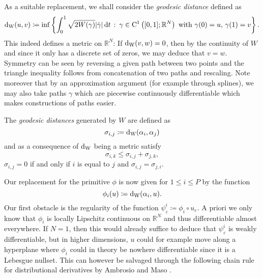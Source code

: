 As a suitable replacement, we shall consider the \emph{geodesic distance} defined as 
\begin{equation*}
		\geodesic_distance ( u, v )
		\coloneqq
		\inf
		\left\{
		\int_{ 0 }^{ 1 }
		\sqrt{ 2 W ( \gamma ) }
		\abs{ \dot{ \gamma }  }
		\dd{t}
		\,
		\colon
		\, \gamma \in \mathrm{ C }^{ 1 } \left( [0, 1 ] ; \mathbb{ R }^{ N } \right) \text{ with } \gamma( 0 ) = u,\, \gamma( 1 )= v 
		\right\}.
\end{equation*}
This indeed defines a metric on $ \mathbb{ R }^{ N } $: If $ \geodesic_distance ( v, w ) = 0 $, then by the continuity of $ W $ and since it only has a discrete set of zeros, we may deduce that $ v = w $. Symmetry can be seen by reversing a given path between two points and the triangle inequality follows from concatenation of two paths and rescaling.
Note moreover that by an approximation argument (for example through splines), we may also take paths $ \gamma $ which are piecewise continuously differentiable which makes constructions of paths easier.

The \emph{geodesic distances} generated by $ W $  are defined as
\begin{equation*}
	\sigma_{ i , j } 
	\coloneqq
	\geodesic_distance ( \alpha_{ i } , \alpha_{ j } )
\end{equation*}
and as a consequence of $ \geodesic_distance $ being a metric satisfy
\begin{equation*}
	\sigma_{ i , k } \leq \sigma_{ i , j } + \sigma_{ j , k },
\end{equation*}
$ \sigma_{ i , j } = 0 $ if and only if $ i $ is equal to $ j $ and $ \sigma_{ i , j } = \sigma_{ j, i } $.

Our replacement for the primitive $ \phi $ is now given for $ 1 \leq i \leq P $ by the function
\begin{equation*}
	\phi_{ i } ( u ) 
	\coloneqq
	\geodesic_distance ( \alpha_{ i } , u ).
\end{equation*}
Our first obstacle is the regularity of the function $ \psi_{ \varepsilon }^{ i } \coloneqq \phi_{ i } \circ u_{ \varepsilon } $. A priori we only know that $ \phi_{ i } $ is locally Lipschitz continuous on $ \mathbb{ R }^{ N } $ and thus differentiable almost everywhere. If $ N = 1 $, then this would already suffice to deduce that $ \psi_{ \varepsilon  }^{ i } $ is weakly differentiable, but in higher dimensions, $ u $ could for example move along a hyperplane where $ \phi_{ i } $ could in theory be nowhere differentiable since it is a Lebesgue nullset. This can however be salvaged through the following chain rule for distributional derivatives by Ambrosio and Maso \cite[Cor.~3.2]{ambrosio_maso_chain_rule}.


